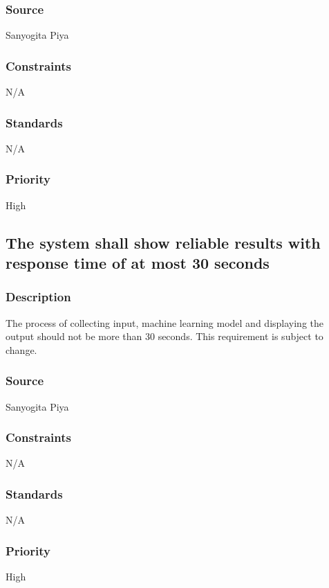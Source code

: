 \subsubsection{Source}
Sanyogita Piya
\subsubsection{Constraints}
N/A
\subsubsection{Standards}
N/A
\subsubsection{Priority}
High


\subsection{The system shall show reliable results with response time of at most 30 seconds}

\subsubsection{Description}
The process of collecting input, machine learning model and displaying the output should not be more than 30 seconds. This requirement is subject to change.
\subsubsection{Source}
Sanyogita Piya
\subsubsection{Constraints}
N/A
\subsubsection{Standards}
N/A
\subsubsection{Priority}
High
